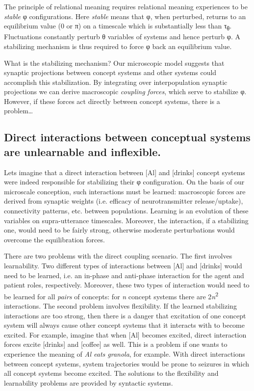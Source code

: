   The principle of relational meaning requires relational meaning experiences to be \textit{stable} φ configurations. Here \textit{stable} means that φ, when perturbed, returns to an equilibrium value (0 or π) on a timescale which is substantially less than τ\textsubscript{θ}. Fluctuations constantly perturb θ variables of systems and hence perturb φ. A stabilizing mechanism is thus required to force φ back an equilibrium value. 

  What is the stabilizing mechanism? Our microscopic model suggests that synaptic projections between concept systems and other systems could accomplish this stabilization. By integrating over interpopulation synaptic projections we can derive macroscopic \textit{coupling forces}, which serve to stabilize φ. However, if these forces act directly between concept systems, there is a problem…

\subsection{Direct interactions between conceptual systems are unlearnable and inflexible.} 

Lets imagine that a direct interaction between [Al] and [drinks] concept systems were indeed responsible for stabilizing their φ configuration. On the basis of our microscale conception, such interactions must be learned: macroscopic forces are derived from synaptic weights (i.e. efficacy of neurotransmitter release/uptake), connectivity patterns, etc. between populations. Learning is an evolution of these variables on supra-utterance timescales. Moreover, the interaction, if a stabilizing one, would need to be fairly strong, otherwise moderate perturbations would overcome the equilibration forces. 

  There are two problems with the direct coupling scenario. The first involves learnability. Two different types of interactions between [Al] and [drinks] would need to be learned, i.e. an in-phase and anti-phase interaction for the agent and patient roles, respectively. Moreover, these two types of interaction would need to be learned for all \textit{pairs} of concepts: for \textit{n} concept systems there are 2\textit{n}\textsuperscript{2} interactions. The second problem involves flexibility. If the learned stabilizing interactions are too strong, then there is a danger that excitation of one concept system will always cause other concept systems that it interacts with to become excited. For example, imagine that when [Al] becomes excited, direct interaction forces excite [drinks] and [coffee] as well. This is a problem if one wants to experience the meaning of \textit{Al eats granola}, for example. With direct interactions between concept systems, system trajectories would be prone to seizures in which all concept systems become excited. The solutions to the flexibility and learnability problems are provided by syntactic systems.

